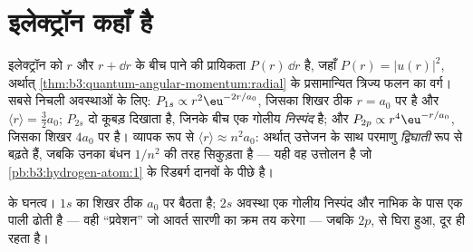 \section{इलेक्ट्रॉन कहाँ है}

\begin{proposition}[त्रिज्य बंटन]\label{prop:b3:hydrogen-atom:radial}
इलेक्ट्रॉन को $r$ और $r + \dd r$ के बीच पाने की प्रायिकता
$P(r)\,\dd r$ है, जहाँ $P(r) = |u(r)|^2$, अर्थात्
\cref{thm:b3:quantum-angular-momentum:radial} के प्रसामान्यित त्रिज्य फलन का वर्ग। सबसे निचली अवस्थाओं के लिए:
$P_{1s} \propto r^2\eu^{-2r/a_0}$, जिसका शिखर ठीक $r = a_0$ पर है और
$\langle r\rangle = \tfrac32 a_0$; $P_{2s}$ दो कूबड़ दिखाता है,
जिनके बीच एक गोलीय \emph{निस्पंद} है; और $P_{2p} \propto
r^4\eu^{-r/a_0}$, जिसका शिखर $4a_0$ पर है। व्यापक रूप से $\langle r\rangle
\approx n^2a_0$: अर्थात् उत्तेजन के साथ परमाणु \emph{द्विघाती} रूप से
बढ़ते हैं, जबकि उनका बंधन $1/n^2$ की तरह सिकुड़ता है --- यही वह उत्तोलन
है जो \cref{pb:b3:hydrogen-atom:1} के रिडबर्ग दानवों के पीछे है।
\end{proposition}
\admitted

\begin{omfigure}

{\small {} के घनत्व। $1s$ का शिखर ठीक
$a_0$ पर बैठता है; $2s$ अवस्था एक गोलीय निस्पंद और नाभिक के पास एक
पाली ढोती है --- वही ``प्रवेशन'' जो आवर्त सारणी का क्रम तय करेगा ---
जबकि $2p$,  से घिरा हुआ, दूर ही रहता
है।}
\end{omfigure}

